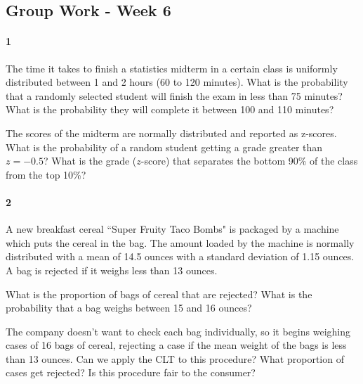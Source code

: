 \documentclass{article}
\begin{document}
\begin{flushleft}
\section*{Group Work - Week 6}
\paragraph{1}
\begin{enumalpha}
\item The time it takes to finish a statistics midterm in a certain class is uniformly distributed between 1 and 2 hours (60 to 120 minutes). What is the probability that a randomly selected student will finish the exam in less than 75 minutes? What is the probability they will complete it between 100 and 110 minutes?
\vspace{3.25in}
\item The scores of the midterm are normally distributed and reported as z-scores. What is the probability of a random student getting a grade greater than $z = -0.5$? What is the grade ($z$-score) that separates the bottom 90\% of the class from the top 10\%?
\end{enumalpha}



\newpage
\paragraph{2} A new breakfast cereal ``Super Fruity Taco Bombs" is packaged by a machine which puts the cereal in the bag. The amount loaded by the machine is normally distributed with a mean of 14.5 ounces with a standard deviation of 1.15 ounces. A bag is rejected if it weighs less than 13 ounces.
\begin{enumalpha}
\item What is the proportion of bags of cereal that are rejected? What is the probability that a bag weighs between 15 and 16 ounces?
\vspace{3.25in}
\item The company doesn't want to check each bag individually, so it begins weighing cases of 16 bags of cereal, rejecting a case if the mean weight of the bags is less than 13 ounces. Can we apply the CLT to this procedure? What proportion of cases get rejected? Is this procedure fair to the consumer?
\end{enumalpha}

\newpage

\end{flushleft}
\end{document}
